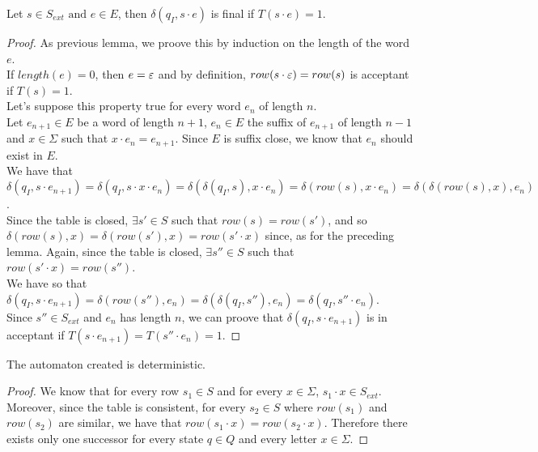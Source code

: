 \begin{lemma}
  \label{lemma:L_acceptance}
  Let $s \in S_{ext} \text{ and } e \in E$, then $\delta(q_I, s \cdot e)$ is final if $T(s \cdot e) = 1$.
\end{lemma}

\begin{proof}
  As previous lemma, we proove this by induction on the length of the word $e$.\\
  If $length(e) = 0$, then $e = \varepsilon$ and by definition, $row(s \cdot \varepsilon) = row(s)$ is acceptant if $T(s) = 1$.\\
  Let's suppose this property true for every word $e_n$ of length $n$.\\
  Let $e_{n+1} \in E$ be a word of length $n + 1$, $e_n \in E$ the suffix of $e_{n+1}$ of length $n - 1$ and $x \in \Sigma$ such that $x \cdot e_n = e_{n+1}$. Since $E$ is suffix close, we know that $e_n$ should exist in $E$.\\
  We have that $\delta(q_I, s \cdot e_{n+1}) = \delta(q_I, s \cdot x \cdot e_n) = \delta(\delta(q_I, s), x \cdot e_n) = \delta(row(s), x \cdot e_n) = \delta(\delta(row(s), x), e_n)$.\\
  Since the table is closed, $\exists s' \in S$ such that $row(s) = row(s')$, and so $\delta(row(s), x) = \delta(row(s'), x) = row(s' \cdot x)$ since, as for the preceding lemma. Again, since the table is closed, $\exists s'' \in S$ such that $row(s' \cdot x) = row(s'')$.\\
  We have so that $\delta(q_I, s \cdot e_{n+1}) = \delta(row(s''), e_n) = \delta(\delta(q_I, s''), e_n) = \delta(q_I, s'' \cdot e_n)$.\\
  Since $s'' \in S_{ext}$ and $e_n$ has length $n$, we can proove that  $\delta(q_I, s \cdot e_{n+1})$ is in acceptant if $T(s \cdot e_{n+1}) = T(s'' \cdot e_n) = 1$.
\end{proof}

\begin{lemma}
  The automaton created is deterministic.
\end{lemma}

\begin{proof}
  We know that for every row $s_1 \in S$ and for every $x \in \Sigma$, $s_1 \cdot x \in S_{ext}$. Moreover, since the table is consistent, for every $s_2 \in S$ where $row(s_1)$ and $row(s_2)$ are similar, we have that $row(s_1 \cdot x) = row(s_2 \cdot x)$. Therefore there exists only one successor for every state $q \in Q$ and every letter $x \in \Sigma$.
\end{proof}

